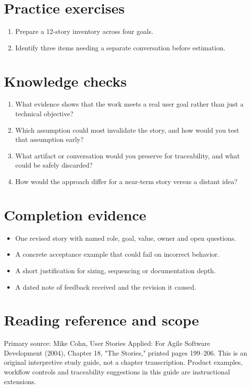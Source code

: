 \documentclass[11pt,letterpaper]{article}
\begin{document}
\section{Practice exercises}
\begin{enumerate}[leftmargin=*,itemsep=3pt]
\item Prepare a 12-story inventory across four goals.
\item Identify three items needing a separate conversation before estimation.
\end{enumerate}
\section{Knowledge checks}
\begin{enumerate}[leftmargin=*,itemsep=3pt]
\item What evidence shows that the work meets a real user goal rather than just a technical objective?
\item Which assumption could most invalidate the story, and how would you test that assumption early?
\item What artifact or conversation would you preserve for traceability, and what could be safely discarded?
\item How would the approach differ for a near-term story versus a distant idea?
\end{enumerate}
\section{Completion evidence}
\begin{itemize}[leftmargin=*,itemsep=2pt]
\item One revised story with named role, goal, value, owner and open questions.
\item A concrete acceptance example that could fail on incorrect behavior.
\item A short justification for sizing, sequencing or documentation depth.
\item A dated note of feedback received and the revision it caused.
\end{itemize}
\section{Reading reference and scope}
Primary source: Mike Cohn, User Stories Applied: For Agile Software Development (2004), Chapter 18, "The Stories," printed pages 199–206. This is an original interpretive study guide, not a chapter transcription. Product examples, workflow controls and traceability suggestions in this guide are instructional extensions.
\end{document}
